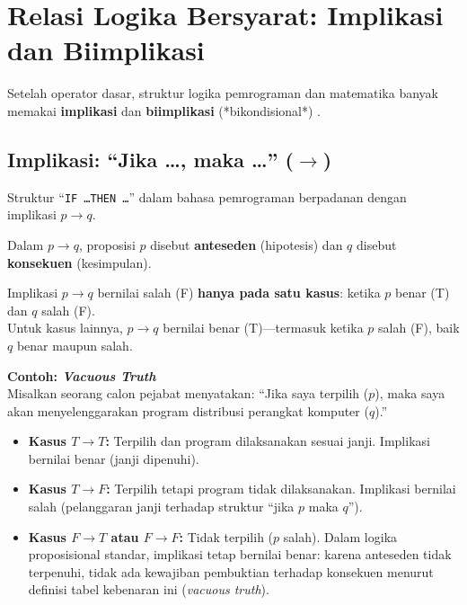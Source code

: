 \section{Relasi Logika Bersyarat: Implikasi dan Biimplikasi}

Setelah operator dasar, struktur logika pemrograman dan matematika banyak memakai \textbf{implikasi} dan \textbf{biimplikasi} (*bikondisional*) \cite{rosen2019}.

\subsection{Implikasi: ``Jika \ldots, maka \ldots'' ($\rightarrow$)}

Struktur ``\texttt{IF \ldots THEN \ldots}'' dalam bahasa pemrograman berpadanan dengan implikasi $p \rightarrow q$.

Dalam $p \rightarrow q$, proposisi $p$ disebut \textbf{anteseden} (hipotesis) dan $q$ disebut \textbf{konsekuen} (kesimpulan).

\begin{definisi}
Implikasi $p \rightarrow q$ bernilai salah (F) \textbf{hanya pada satu kasus}: ketika $p$ benar (T) dan $q$ salah (F).\\
Untuk kasus lainnya, $p \rightarrow q$ bernilai benar (T)---termasuk ketika $p$ salah (F), baik $q$ benar maupun salah.
\end{definisi}

\textbf{Contoh: \textit{Vacuous Truth}} \cite{rosen2019,forallx} \\
Misalkan seorang calon pejabat menyatakan: ``Jika saya terpilih ($p$), maka saya akan menyelenggarakan program distribusi perangkat komputer ($q$).''

\begin{itemize}
    \item \textbf{Kasus $T \rightarrow T$:} Terpilih dan program dilaksanakan sesuai janji. Implikasi bernilai benar (janji dipenuhi).
    \item \textbf{Kasus $T \rightarrow F$:} Terpilih tetapi program tidak dilaksanakan. Implikasi bernilai salah (pelanggaran janji terhadap struktur ``jika $p$ maka $q$'').
    \item \textbf{Kasus $F \rightarrow T$ atau $F \rightarrow F$:} Tidak terpilih ($p$ salah). Dalam logika proposisional standar, implikasi tetap bernilai benar: karena anteseden tidak terpenuhi, tidak ada kewajiban pembuktian terhadap konsekuen menurut definisi tabel kebenaran ini (\textit{vacuous truth}).
\end{itemize}

